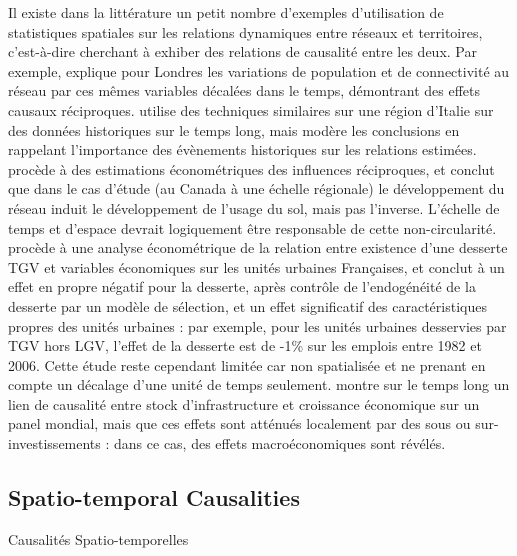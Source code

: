 {}{
Il existe dans la littérature un petit nombre d'exemples d'utilisation de statistiques spatiales sur les relations dynamiques entre réseaux et territoires, c'est-à-dire cherchant à exhiber des relations de causalité entre les deux. Par exemple, \cite{levinson2008density} explique pour Londres les variations de population et de connectivité au réseau par ces mêmes variables décalées dans le temps, démontrant des effets causaux réciproques. \cite{doi:10.1068/b39089} utilise des techniques similaires sur une région d'Italie sur des données historiques sur le temps long, mais modère les conclusions en rappelant l'importance des évènements historiques sur les relations estimées. \cite{cuthbert2005empirical} procède à des estimations économétriques des influences réciproques, et conclut que dans le cas d'étude (au Canada à une échelle régionale) le développement du réseau induit le développement de l'usage du sol, mais pas l'inverse. L'échelle de temps et d'espace devrait logiquement être responsable de cette non-circularité. \cite{koning:hal-00962384} procède à une analyse économétrique de la relation entre existence d'une desserte TGV et variables économiques sur les unités urbaines Françaises, et conclut à un effet en propre négatif pour la desserte, après contrôle de l'endogénéité de la desserte par un modèle de sélection, et un effet significatif des caractéristiques propres des unités urbaines : par exemple, pour les unités urbaines desservies par TGV hors LGV, l'effet de la desserte est de -1\% sur les emplois entre 1982 et 2006. Cette étude reste cependant limitée car non spatialisée et ne prenant en compte un décalage d'une unité de temps seulement. \cite{MANC:MANC1073} montre sur le temps long un lien de causalité entre stock d'infrastructure et croissance économique sur un panel mondial, mais que ces effets sont atténués localement par des sous ou sur-investissements : dans ce cas, des effets macroéconomiques sont révélés.
}





\subsection{Spatio-temporal Causalities}{Causalités Spatio-temporelles}


